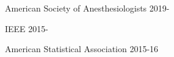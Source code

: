 

\begin{cvaffils}

    \cvaffil
    {American Society of Anesthesiologists} %
    {2019-} %
    
        \cvaffil
    {IEEE} %
    {2015-} %
    
        \cvaffil
    {American Statistical Association} %
    {2015-16} %

\end{cvaffils}
